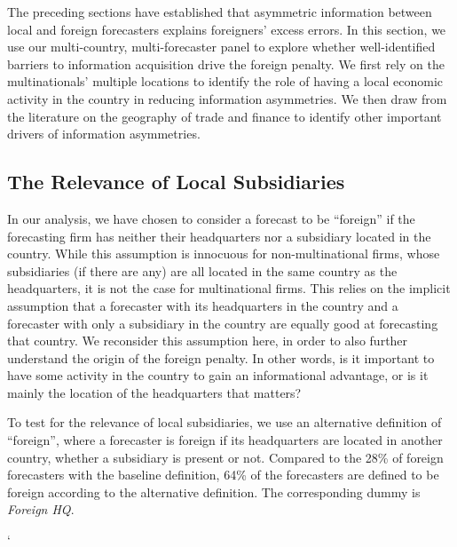 
The preceding sections have established that asymmetric information between local and foreign forecasters explains foreigners' excess errors. In this section, we use our multi-country, multi-forecaster panel to explore whether well-identified barriers to information acquisition drive the foreign penalty. We first rely on the multinationals' multiple locations to identify the role of having a local economic activity in the country in reducing information asymmetries. We then draw from the literature on the geography of trade and finance to identify other important drivers of information asymmetries.

\subsection{The Relevance of Local Subsidiaries}

In our analysis, we have chosen to consider a forecast to be ``foreign'' if the forecasting firm has neither their headquarters nor a subsidiary located in the country. While this assumption is innocuous for non-multinational firms, whose subsidiaries (if there are any) are all located in the same country as the headquarters, it is not the case for multinational firms. This relies on the implicit assumption that a forecaster with its headquarters in the country and a forecaster with only a subsidiary in the country are equally good at forecasting that country. We reconsider this assumption here, in order to also further understand the origin of the foreign penalty. In other words, is it important to have some activity in the country to gain an informational advantage, or is it mainly the location of the headquarters that matters?

To test for the relevance of local subsidiaries, we use an alternative definition of ``foreign'', where a forecaster is foreign if its headquarters are located in another country, whether a subsidiary is present or not.  Compared to the 28\% of foreign forecasters with the baseline definition, 64\% of the forecasters are defined to be foreign according to the alternative definition. The corresponding dummy is \textit{Foreign HQ}.

{`

}

%	

